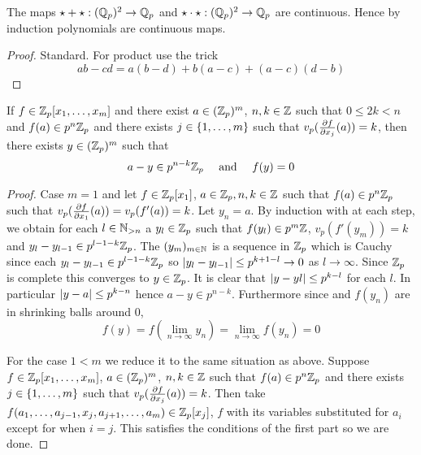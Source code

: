 \begin{prop}
    The maps $\star + \star : (\mathbb{Q}_p)^2 \to \mathbb{Q}_p$ and 
    $\star \cdot \star : (\mathbb{Q}_p)^2 \to \mathbb{Q}_p$ are continuous.
    Hence by induction polynomials are continuous maps.
\end{prop}
\begin{proof}
    Standard.
    For product use the trick
    \[ab - cd = a(b - d) + b(a - c) +(a - c)(d - b)\]
\end{proof}

\begin{prop}
    If $f \in \mathbb{Z}_p[x_1,\dots, x_m]$ and there exist 
    $a \in (\mathbb{Z}_p)^m$,
    $n, k \in \mathbb{Z}$ such that $0 \le 2k < n$ and 
    $f(a) \in p^n \mathbb{Z}_p$
    and there exists $j \in \left\{1, \dots, m\right\}$ such that 
    $v_p (\frac{\partial f}{\partial x_j}(a)) = k$,
    then there exists $y \in (\mathbb{Z}_p)^m$ such that
    \[a - y \in p^{n-k} \mathbb{Z}_p \quad \text{ and } \quad f(y) = 0\]
\end{prop}
\begin{proof}
    Case $m = 1$ and let $f \in \mathbb{Z}_p[x_1]$, 
    $a \in \mathbb{Z}_p, n, k \in \mathbb{Z}$ such that $f(a) \in p^n \mathbb{Z}_p$
    such that 
    $v_p (\frac{\partial f}{\partial x_1}(a)) = v_p(f'(a))= k$.
    Let $y_n = a$.
    By induction with  
    at each step, 
    we obtain for each $l \in \mathbb{N}_{> n}$ a 
    $y_l \in \mathbb{Z}_p$ such that $f(y_l) \in p^{m} \mathbb{Z}$,
    $v_p(f'(y_m)) = k$ and 
    $y_{l} - y_{l-1} \in p^{l-1-k} \mathbb{Z}_p$.
    The $(y_m)_{m \in \mathbb{N}}$ is a sequence in $\mathbb{Z}_p$
    which is Cauchy since each $y_{l} - y_{l-1} \in p^{l-1-k} \mathbb{Z}_p$
    so $\left\vert y_{l} - y_{l-1} \right\vert \le p^{k + 1 - l} \to 0$ 
    as $l \to \infty$.
    Since $\mathbb{Z}_p$ is complete this converges to $y \in \mathbb{Z}_p$.
    It is clear that $\left\vert y - y{l} \right\vert \le p^{k-l}$
    for each $l$. 
    In particular $\left\vert y - a \right\vert \le p^{k-n}$
    hence $a - y \in p^{n-k}$.
    Furthermore since 
    and $f(y_n)$ are in shrinking balls around $0$,
    \[f(y) = f(\lim_{n \to \infty} y_n) = 
    \lim_{n \to \infty} f(y_n) = 0\]
    
    For the case $1 < m$ 
    we reduce it to the same situation as above.
    Suppose $f \in \mathbb{Z}_p[x_1,\dots, x_m]$,
    $a \in (\mathbb{Z}_p)^m$,
    $n, k \in \mathbb{Z}$ such that $f(a) \in p^n \mathbb{Z}_p$
    and there exists $j \in \left\{1, \dots, m\right\}$ such that 
    $v_p (\frac{\partial f}{\partial x_j}(a)) = k$.
    Then take 
    $f(a_1,\dots, a_{j-1}, x_j, a_{j+1},\dots, a_m) \in \mathbb{Z}_p[x_j]$,
    $f$ with its variables substituted for $a_i$ except for when $i = j$.
    This satisfies the conditions of the first part
    so we are done.
\end{proof}

